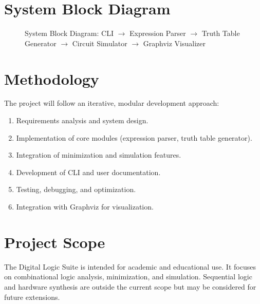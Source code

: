 \documentclass[a4paper,12pt]{article}
\begin{document}
\section{System Block Diagram}
\begin{figure}[ht!]
    \centering
    \caption{System Block Diagram: CLI $\rightarrow$ Expression Parser $\rightarrow$ Truth Table Generator $\rightarrow$ Circuit Simulator $\rightarrow$ Graphviz Visualizer}
\end{figure}

\section{Methodology}
The project will follow an iterative, modular development approach:
\begin{enumerate}
    \item Requirements analysis and system design.
    \item Implementation of core modules (expression parser, truth table generator).
    \item Integration of minimization and simulation features.
    \item Development of CLI and user documentation.
    \item Testing, debugging, and optimization.
    \item Integration with Graphviz for visualization.
\end{enumerate}

\section{Project Scope}
The Digital Logic Suite is intended for academic and educational use. It focuses on combinational logic analysis, minimization, and simulation. Sequential logic and hardware synthesis are outside the current scope but may be considered for future extensions.

\end{document}
